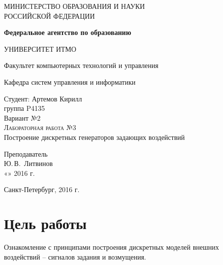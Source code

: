 \documentclass[a4paper,14pt]{extreport}
\begin{document}
	
	\begin{titlepage}
		\begin{center}
			\large
			МИНИСТЕРСТВО ОБРАЗОВАНИЯ И НАУКИ\\ РОССИЙСКОЙ ФЕДЕРАЦИИ
			
			\textbf{Федеральное агентство по образованию}
			\vspace{0.5cm}
			
			УНИВЕРСИТЕТ ИТМО
			\vspace{0.25cm}
			
			Факультет компьютерных технологий и управления
			
			Кафедра систем управления и информатики
			\vfill
			
			
			Студент: Артемов Кирилл\\
			группа P4135\\
			Вариант №2\\
			\textsc{Лабораторная работа №3}\\[5mm]
			
			{\LARGE Построение дискретных генераторов задающих воздействий}
			\bigskip
			
		\end{center}
		\vfill
		
		\newlength{\ML}
		\hfill\begin{minipage}{0.4\textwidth}
			Преподаватель\\
			\underline{\hspace{\ML}} Ю.\,В.~Литвинов\\
			«\underline{\hspace{0.7cm}}» \underline{\hspace{2cm}} 2016 г.
		\end{minipage}%
		\bigskip
		
		\vfill
		
		\begin{center}
			Санкт-Петербург, 2016 г.
		\end{center}
	\end{titlepage}
\newpage

\section{Цель работы}

Ознакомление с принципами построения дискретных моделей внешних
воздействий – сигналов задания и возмущения.
\end{document}
